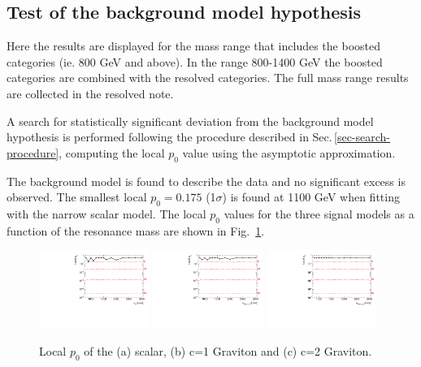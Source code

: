 \clearpage

\subsection{Test of the background model hypothesis}

Here the results are displayed for the mass range that includes the boosted categories (ie. 800 GeV and above).  In the range 800-1400 GeV the boosted categories are combined with the resolved categories. The full mass range results are collected in the resolved note.

A search for statistically significant deviation from the background model hypothesis is performed following the procedure described in Sec.\,\ref{sec-search-procedure}, computing the local $p_0$ value using the asymptotic approximation.

The background model is found to describe the data and no significant excess is observed. The smallest local $p_0=0.175$ (1$\sigma$) is found at 1100 GeV when fitting with the narrow scalar model. The local $p_0$ values for the three signal models as a function of the resonance mass are shown in Fig.~\ref{fig:localp0}.

\begin{figure}[htbp!]
\begin{center}
\includegraphics[width=0.32\textwidth,angle=-90]{figures/boosted/results/p0_s_allmasses_boosted.pdf}
\includegraphics[width=0.32\textwidth,angle=-90]{figures/boosted/results/p0_g10_allmasses_boosted.pdf}
\includegraphics[width=0.32\textwidth,angle=-90]{figures/boosted/results/p0_g20_allmasses_boosted.pdf} 
\caption{Local $p_0$ of the (a) scalar, (b) c=1 Graviton and (c) c=2 Graviton.}
\label{fig:localp0}
\end{center}
\end{figure}

